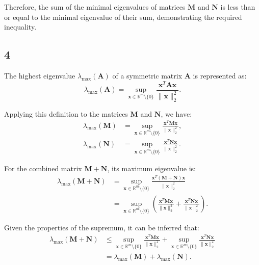 \documentclass{article}
\begin{document}
Therefore, the sum of the minimal eigenvalues of matrices $\boldsymbol{M}$ and $\boldsymbol{N}$ is less than or equal to the minimal eigenvalue of their sum, demonstrating the required inequality.
\subsection{4}
The highest eigenvalue $\lambda_{\max }(\boldsymbol{A})$ of a symmetric matrix $\boldsymbol{A}$ is represented as:
$$
\lambda_{\max }(\boldsymbol{A}) = \sup_{\boldsymbol{x} \in \mathbb{R}^m \setminus \{0\}} \frac{\boldsymbol{x}^T \boldsymbol{A} \boldsymbol{x}}{\|\boldsymbol{x}\|_2^2}.
$$

Applying this definition to the matrices $\boldsymbol{M}$ and $\boldsymbol{N}$, we have:
\begin{align*}
\lambda_{\max }(\boldsymbol{M}) &= \sup_{\boldsymbol{x} \in \mathbb{R}^m \setminus \{0\}} \frac{\boldsymbol{x}^T \boldsymbol{M} \boldsymbol{x}}{\|\boldsymbol{x}\|_2^2}, \\
\lambda_{\max }(\boldsymbol{N}) &= \sup_{\boldsymbol{x} \in \mathbb{R}^m \setminus \{0\}} \frac{\boldsymbol{x}^T \boldsymbol{N} \boldsymbol{x}}{\|\boldsymbol{x}\|_2^2}.
\end{align*}

For the combined matrix $\boldsymbol{M} + \boldsymbol{N}$, its maximum eigenvalue is:
\begin{align*}
\lambda_{\max }(\boldsymbol{M} + \boldsymbol{N}) &= \sup_{\boldsymbol{x} \in \mathbb{R}^m \setminus \{0\}} \frac{\boldsymbol{x}^T(\boldsymbol{M} + \boldsymbol{N}) \boldsymbol{x}}{\|\boldsymbol{x}\|_2^2} \\
&= \sup_{\boldsymbol{x} \in \mathbb{R}^m \setminus \{0\}} \left( \frac{\boldsymbol{x}^T \boldsymbol{M} \boldsymbol{x}}{\|\boldsymbol{x}\|_2^2} + \frac{\boldsymbol{x}^T \boldsymbol{N} \boldsymbol{x}}{\|\boldsymbol{x}\|_2^2} \right).
\end{align*}

Given the properties of the supremum, it can be inferred that:
\begin{align*}
\lambda_{\max }(\boldsymbol{M} + \boldsymbol{N}) &\leq \sup_{\boldsymbol{x} \in \mathbb{R}^m \setminus \{0\}} \frac{\boldsymbol{x}^T \boldsymbol{M} \boldsymbol{x}}{\|\boldsymbol{x}\|_2^2} + \sup_{\boldsymbol{x} \in \mathbb{R}^m \setminus \{0\}} \frac{\boldsymbol{x}^T \boldsymbol{N} \boldsymbol{x}}{\|\boldsymbol{x}\|_2^2} \\
&= \lambda_{\max }(\boldsymbol{M}) + \lambda_{\max }(\boldsymbol{N}).
\end{align*}
\end{document}
